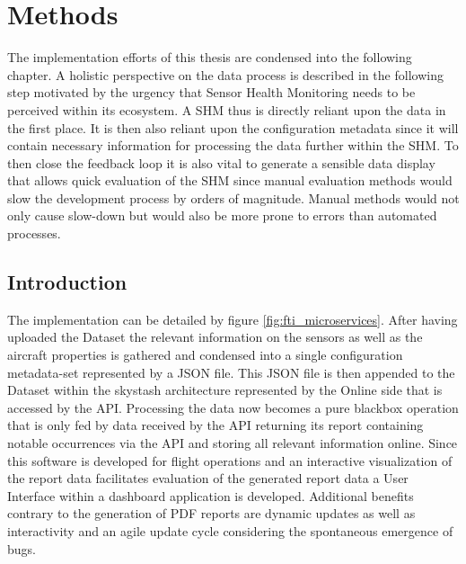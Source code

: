 %

\chapter{Methods}
\label{chap:4-methods}
The implementation efforts of this thesis are condensed into the following chapter. A holistic perspective on the data process is described in the following step motivated by the urgency that Sensor Health Monitoring needs to be perceived within its ecosystem. A SHM thus is directly reliant upon the data in the first place. It is then also reliant upon the configuration metadata since it will contain necessary information for processing the data further within the SHM. To then close the feedback loop it is also vital to generate a sensible data display that allows quick evaluation of the SHM since manual evaluation methods would slow the development process by orders of magnitude. Manual methods would not only cause slow-down but would also be more prone to errors than automated processes.\cite{barchard_preventing_2011}

\section{Introduction}

The implementation can be detailed by figure \ref{fig:fti_microservices}. After having uploaded the Dataset the relevant information on the sensors as well as the aircraft properties is gathered and condensed into a single configuration metadata-set represented by a JSON file. This JSON file is then appended to the Dataset within the skystash architecture represented by the Online side that is accessed by the API. Processing the data now becomes a pure blackbox operation that is only fed by data received by the API returning its report containing notable occurrences via the API and storing all relevant information online. Since this software is developed for flight operations and an interactive visualization of the report data facilitates evaluation of the generated report data a User Interface within a dashboard application is developed. Additional benefits contrary to the generation of PDF reports are dynamic updates as well as interactivity and an agile update cycle considering the spontaneous emergence of bugs.


